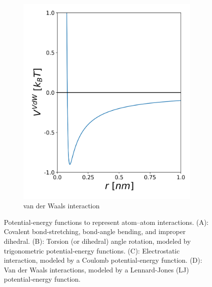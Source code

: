 \begin{figure}[h!]
\begin{subfigure}{0.45\textwidth}
        \includegraphics[width=\textwidth]{2_chapter_intro/fig/ForceField/vdwV.png}
        \caption{van der Waals interaction}
	\label{sfig: lj}
    \end{subfigure}
    \caption{Potential-energy functions to represent atom--atom interactions. (A): Covalent bond-stretching, bond-angle bending, and improper dihedral. (B): Torsion (or dihedral) angle rotation, modeled by trigonometric potential-energy functions. (C): Electrostatic interaction, modeled by a Coulomb potential-energy function. (D): Van der Waals interactions, modeled by a Lennard-Jones (LJ) potential-energy function.}
    \label{fig:FF_Functions}
\end{figure}

